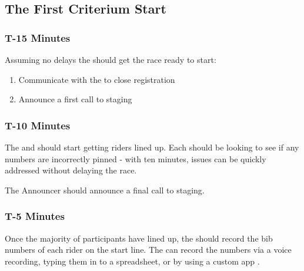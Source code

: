 \subsection[First Criterium Start]{The First Criterium Start}

\subsubsection{T-15 Minutes}

Assuming no delays%
the  should get the race ready to start:

\begin{enumerate}
  \item Communicate with the  to close registration%
  \item Announce a first call to staging%
\end{enumerate}

\subsubsection{T-10 Minutes}

The  and  should start getting riders lined up.
Each should be looking to see if any numbers are incorrectly pinned - with ten minutes, issues can be quickly addressed
without delaying the race.

The Announcer should announce a final call to staging.

\subsubsection{T-5 Minutes}

Once the majority of participants have lined up, the  should record the bib numbers
of each rider on the start line.
The  can record the numbers via a voice recording, typing them in to a spreadsheet,
or by using a custom app%
.

